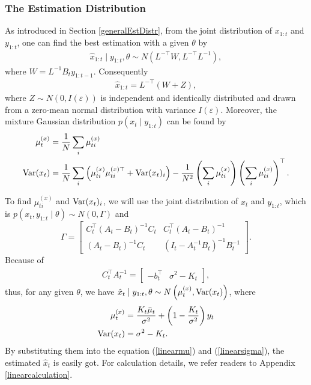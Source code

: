 \subsubsection*{The Estimation Distribution}

As introduced in Section \ref{generalEstDistr}, from the joint distribution of $x_{1:t}$ and $y_{1:t}$, one can find the best estimation with a given $\theta$ by
\begin{align*}
\hat{x}_{1:t} \mid y_{1:t},\theta \sim N\left(L^{-\top}W,L^{-\top}L^{-1}\right),
\end{align*}
where $W = L^{-1}B_{t}y_{1:t-1}$. 
Consequently 
\begin{align*}
\hat{x}_{1:t} = L^{-\top}(W+Z),
\end{align*}
where $Z \sim N\left(0, I(\varepsilon)\right)$ is independent and identically distributed and drawn from a zero-mean normal distribution with variance $ I(\varepsilon)$. Moreover, the mixture Gaussian distribution $p(x_t \mid y_{1:t})$ can be found by 
\begin{align}
\mu_t^{(x)} &= \frac{1}{N} \sum_i \mu_{ti}^{(x)} \label{linearmu}  \\
\mathrm{Var}(x_t) &= \frac{1}{N} \sum_i \left( \mu_{ti}^{(x)}  \mu_{ti}^{(x)\top} +\mathrm{Var}(x_t)_i\right) -\frac{1}{N^2} \left(  \sum_i  \mu_{ti}^{(x)} \right) \left( \sum_i \mu_{ti}^{(x)} \right) ^\top.\label{linearsigma} 
\end{align}


To find $\mu_{ti}^{(x)}$ and $\mathrm{Var}(x_t)_i$, we will use the joint distribution of $x_{t}$ and $y_{1:t}$, which is $p(x_{t}, y_{1:t}  \mid  \theta)\sim N(0,\Gamma)$ and 
\begin{equation*}
\Gamma=\begin{bmatrix} C_{t}^\top(A_t-B_t)^{-1}C_{t} & C_{t}^\top(A_t-B_t)^{-1}\\(A_t-B_t)^{-1}C_{t} & (I_t-A_t^{-1}B_t)^{-1}B_t^{-1} \end{bmatrix}.
\end{equation*}
Because of 
\begin{align*}
C_{t}^\top A_{t}^{-1} = \left[\begin{matrix} - b_{t}^\top & \sigma^2- K_{t} \end{matrix} \right],
\end{align*}
thus, for any given $\theta$, we have $\hat{x}_{t}\mid y_{1:t},\theta \sim N\left( \mu_{t}^{(x)},\mathrm{Var}(x_t) \right)$, where
\begin{align}
\mu_{t}^{(x)} &  =  \frac{K_{t}\bar{\mu}_{t}}{\sigma^2}+\left(1-\frac{K_{t}}{\sigma^2}\right)y_{t} \\
\mathrm{Var}(x_t)&= \sigma^2-K_{t}.
\end{align}
By substituting them into the equation (\ref{linearmu}) and (\ref{linearsigma}), the estimated $\hat{x}_t$ is easily got. For calculation details, we refer readers to Appendix \ref{linearcalculation}.


